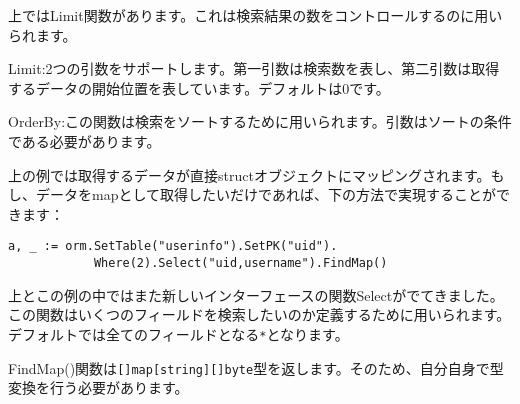 上ではLimit関数があります。これは検索結果の数をコントロールするのに用いられます。

Limit:2つの引数をサポートします。第一引数は検索数を表し、第二引数は取得するデータの開始位置を表しています。デフォルトは0です。

OrderBy:この関数は検索をソートするために用いられます。引数はソートの条件である必要があります。

上の例では取得するデータが直接structオブジェクトにマッピングされます。もし、データをmapとして取得したいだけであれば、下の方法で実現することができます：

\begin{lstlisting}[numbers=none]
a, _ := orm.SetTable("userinfo").SetPK("uid").
            Where(2).Select("uid,username").FindMap()
\end{lstlisting}

上とこの例の中ではまた新しいインターフェースの関数Selectがでてきました。この関数はいくつのフィールドを検索したいのか定義するために用いられます。デフォルトでは全てのフィールドとなる\texttt{*}となります。

FindMap()関数は\texttt{[]map[string][]byte}型を返します。そのため、自分自身で型変換を行う必要があります。
